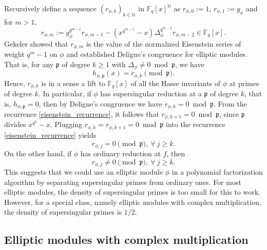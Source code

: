 \documentclass[12pt]{article}
\theoremstyle{plain}
\theoremstyle{definition}
\def\F{\ensuremath{\mathbb{F}}}
\newcommand{\D}{\Delta}
\newcommand{\p}{\mathfrak p}
\begin{document}
Recursively define a sequence $(r_{\phi,k})_{k \in \mathbb{N}}$ in $\F_q[x]^\mathbb{N}$ as 
$r_{\phi,0}:=1$, $r_{\phi,1}:=g_\phi$ and for $m>1$,
\begin{equation}
\label{eisenstein_recurrence}
	r_{\phi,m} := g_\phi^{q^{m-1}}r_{\phi,m-1} - (x^{q^{m-1}}-x)\D_\phi^{q^{m-2}} r_{\phi,m-2} \in 
	\F_q[x].
\end{equation}
Gekeler \cite[Eq 3.6, Prop 3.7]{gek} showed that $r_{\phi,m}$ is the value of the normalized 
Eisenstein series of weight $q^{m}-1$ on $\phi$ and established Deligne's congruence for elliptic 
modules. That is, for any $\p$ of degree $k \geq 1$ with $\Delta_\phi \neq 0 \bmod \p$, we have
\begin{equation}
\label{deligne_congruence}
	h_{\phi, \p}(x) = r_{\phi,k} \pmod{\p}.
\end{equation}
Hence, $r_{\phi,k}$ is in a sense a lift to $\F_q[x]$ of all the Hasse invariants of $\phi$ at 
primes of degree $k$. In particular, if $\phi$ has supersingular reduction at a $\p$ of degree $k$, 
that is, $h_{\phi, \p} = 0$, then by Deligne's congruence we have $r_{\phi,k} = 0 \bmod \p$. From 
the recurrence \eqref{eisenstein_recurrence}, it follows that $r_{\phi,k+1} = 0 \bmod \p$, since 
$\p$ divides $x^{q^k} - x$. Plugging $r_{\phi,k} = r_{\phi,k+1} = 0 \bmod \p$  into the 
recurrence \eqref{eisenstein_recurrence} yields
\begin{equation}
\label{supersingular_zero}
	r_{\phi,j} = 0 \pmod{\p}, ~ \forall~j \ge k.
\end{equation}
On the other hand, if $\phi$ has ordinary reduction at $f$, then \cite[Lemma~2.3]{cor}
\begin{equation}
\label{supersingular_nonzero}
	r_{\phi,j} \neq 0 \pmod{\p}, ~ \forall~j \ge k.
\end{equation}
This suggests that we could use an elliptic module $\phi$ in a polynomial factorization algorithm 
by separating supersingular primes from ordinary ones. For most elliptic modules, the density of 
supersingular primes is too small for this to work. However, for a special class, namely elliptic 
modules with complex multiplication, the density of supersingular primes is $1/2$. 




\subsection{Elliptic modules with complex multiplication}
\label{sec:elliptic-CM}
\end{document}
